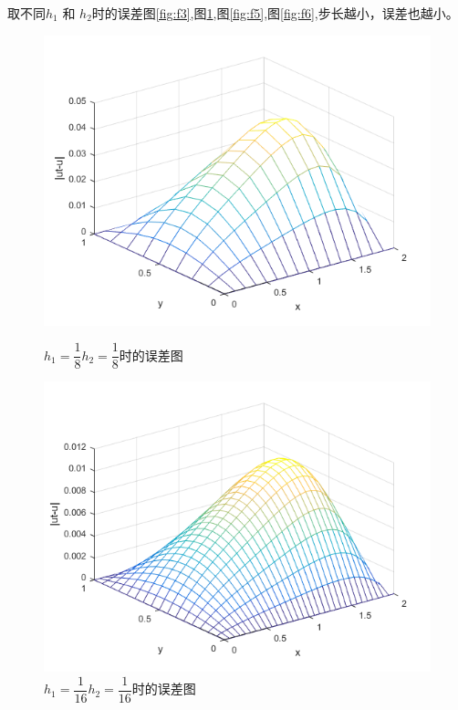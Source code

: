 \documentclass[withoutpreface,bwprint]{cumcmthesis} %
\begin{document}
取不同$h_1$ 和 $h_2$时的误差图\ref{fig:f3},图\ref{fig:f4},图\ref{fig:f5},图\ref{fig:f6},步长越小，误差也越小。
\begin{figure}[htbp]
	\begin{minipage}[htbp]{0.5\linewidth}
		\centering
		\includegraphics[width=1\linewidth]{figures/f3}
		\caption{$h_1=\dfrac{1}{8}$\quad$h_2=\dfrac{1}{8}$时的误差图}
		\label{fig:f3}
	\end{minipage}
	\begin{minipage}[htbp]{0.5\linewidth}
		\centering
		\includegraphics[width=1\linewidth]{figures/f4}
		\caption{$h_1=\dfrac{1}{16}$\quad$h_2=\dfrac{1}{16}$时的误差图}
		\label{fig:f4}
	\end{minipage}
	\begin{minipage}[htbp]{0.5\linewidth}

\end{minipage}
\end{figure}
\end{document}
